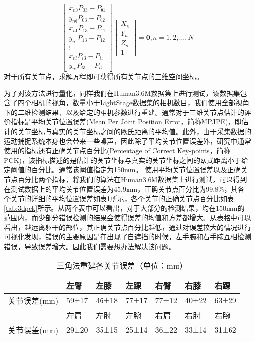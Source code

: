 
\begin{equation}
    \left[ \begin{array}{c}
            x_{n0}P_{03} - P_{01} \\
            y_{n0}P_{03} - P_{02} \\
            x_{n1}P_{13} - P_{11} \\
            y_{n1}P_{13} - P_{12} \\
            \vdots                \\
            x_{ni}P_{i3} - P_{i1} \\
            y_{ni}P_{i3} - P_{i2}
        \end{array}\right] \left[ \begin{array}{c}
            X_n \\
            Y_n \\
            Z_n \\
            1
        \end{array}\right]  = \bm{0}, n = 1,2,\ldots,N
\end{equation}
对于所有关节点，求解方程即可获得所有关节点的三维空间坐标。

为了对该方法进行量化，同样我们在Human3.6M数据集上进行测试，该数据集包含了四个相机的视角，数量小于LightStage数据集的相机数目，我们使用全部视角下的二维检测结果，以及给定的相机参数进行重建。通常对于三维关节点估计的评价指标是平均关节位置误差(Mean Per Joint Position Error，简称MPJPE)，即估计的关节坐标与真实的关节坐标之间的欧氏距离的平均值。此外，由于采集数据的运动捕捉系统本身也会带来一些噪声，因此除了平均关节位置误差外，研究中通常使用的指标还有正确关节点百分比(Percentage of Correct Key-points，简称PCK)，该指标描述的是估计的关节坐标与真实的关节坐标之间的欧式距离小于给定阈值的百分比。通常该阈值指定为150mm。
使用平均关节位置误差以及正确关节点百分比两个指标，将我们的算法在Human3.6M数据集上进行测试，可以得到在测试数据上的平均关节位置误差为45.9mm，正确关节点百分比为99.8\%，其各个关节的详细的平均位置误差如表\ref{tab:3derrorjoint}所示，各个关节的正确关节点百分比如表\ref{tab:3dpck}所示。从两个表中可以看出，对于大部分的检测结果，均在150mm的范围内，而少部分错误检测的结果会使得误差的均值和方差都增大。从表格中可以看出，越远离躯干的部位，其正确关节点百分比越低，通过对误差较大的情况进行可视化发现，错误的主要原因是在出现了自遮挡的时候，左手腕和右手腕互相检测错误，导致误差增大。因此我们需要想办法解决该问题。

\begin{table}[H]
    \centering
    \begin{tabular}{lllllll}
        \hline
                     & 左臀  & 左膝  & 左踝  & 右臀  & 右膝  & 右踝  \\
        \hline
        关节误差(mm) & 59±17 & 46±18 & 77±17 & 77±12 & 40±22 & 63±29 \\
                     & 左肩  & 左肘  & 左腕  & 右肩  & 右肘  & 右腕  \\
        关节误差(mm) & 29±20 & 35±15 & 25±14 & 36±22 & 33±14 & 31±62 \\
        \hline
    \end{tabular}
    \caption{三角法重建各关节误差（单位：mm）\label{tab:3derrorjoint}}
\end{table}

